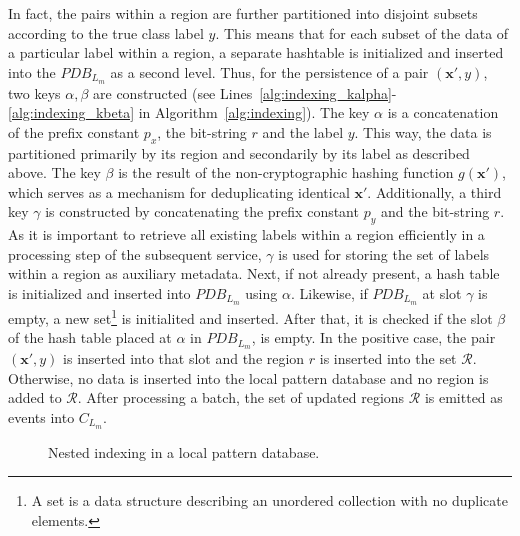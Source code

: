 \documentclass[../../main.tex]{subfiles}
\begin{document}
In fact, the pairs within a region are further partitioned into disjoint subsets according to the true class label $y$. This means that for each subset of the data of a particular label within a region, a separate hashtable is initialized and inserted into the $PDB_{L_m}$ as a second level. Thus, for the persistence of a pair $(\bm{x}', y)$, two keys $\alpha, \beta$ are constructed (see Lines~\ref{alg:indexing_kalpha}-\ref{alg:indexing_kbeta} in Algorithm~\ref{alg:indexing}). The key $\alpha$ is a concatenation of the prefix constant $p_x$, the bit-string $r$ and the label $y$. This way, the data is partitioned primarily by its region and secondarily by its label as described above. The key $\beta$ is the result of the non-cryptographic hashing function $g(\bm{x}')$, which serves as a mechanism for deduplicating identical $\bm{x}'$. Additionally, a third key $\gamma$ is constructed by concatenating the prefix constant $p_y$ and the bit-string $r$. As it is important to retrieve all existing labels within a region efficiently in a processing step of the subsequent service, $\gamma$ is used for storing the set of labels within a region as auxiliary metadata. Next, if not already present, a hash table is initialized and inserted into $PDB_{L_m}$ using $\alpha$. Likewise, if $PDB_{L_m}$ at slot $\gamma$ is empty, a new set\footnote{A set is a data structure describing an unordered collection with no duplicate elements.} is initialited and inserted. After that, it is checked if the slot $\beta$ of the hash table placed at $\alpha$ in $PDB_{L_m}$, is empty. In the positive case, the pair $(\bm{x}', y)$ is inserted into that slot and the region $r$ is inserted into the set $\mathcal{R}$. Otherwise, no data is inserted into the local pattern database and no region is added to $\mathcal{R}$. After processing a batch, the set of updated regions $\mathcal{R}$ is emitted as events into $C_{L_m}$.

\begin{figure}[t]
    \centering
    
    \caption{Nested indexing in a local pattern database.}
    \label{fig:indexing}
\end{figure}
\end{document}
